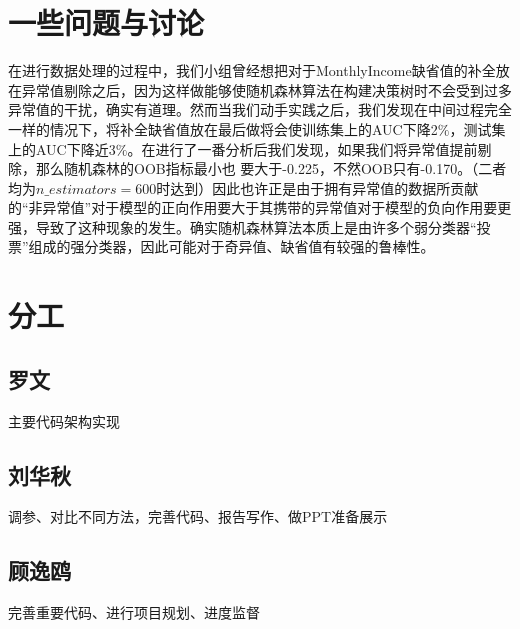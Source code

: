 \documentclass[UTF8,a4paper,10pt]{ctexart}
\begin{document}
\section{一些问题与讨论}
在进行数据处理的过程中，我们小组曾经想把对于MonthlyIncome缺省值的补全放在异常值剔除之后，因为这样做能够使随机森林算法在构建决策树时不会受到过多异常值的干扰，确实有道理。然而当我们动手实践之后，我们发现在中间过程完全一样的情况下，将补全缺省值放在最后做将会使训练集上的AUC下降2$\%$，测试集上的AUC下降近3$\%$。在进行了一番分析后我们发现，如果我们将异常值提前剔除，那么随机森林的OOB指标最小也
要大于-0.225，不然OOB只有-0.170。（二者均为$n\_estimators=600$时达到）因此也许正是由于拥有异常值的数据所贡献的“非异常值”对于模型的正向作用要大于其携带的异常值对于模型的负向作用要更强，导致了这种现象的发生。确实随机森林算法本质上是由许多个弱分类器“投票”组成的强分类器，因此可能对于奇异值、缺省值有较强的鲁棒性。

\section{分工}
\subsection*{罗文}
主要代码架构实现
\subsection*{刘华秋}
调参、对比不同方法，完善代码、报告写作、做PPT准备展示
\subsection*{顾逸鸥}
完善重要代码、进行项目规划、进度监督
\end{document}
